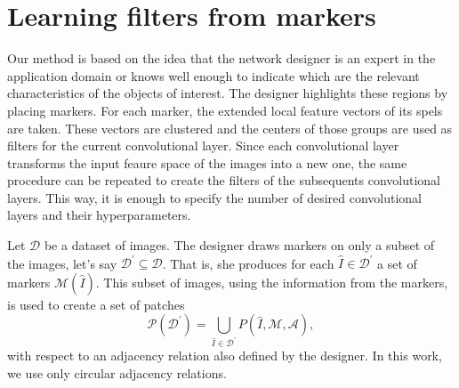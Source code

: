 \documentclass[a4paper,conference]{IEEEtran}
\newcommand{\R}{\mathbb{R}}
\newcommand{\A}{\mathcal{A}}
\newcommand{\D}{\mathcal{D}}
\newcommand{\I}{\hat{I}}
\newcommand{\m}[1]{{\mathrm{\bf #1}}}
\newcommand{\E}{\tilde{\m{I}}}
\newcommand{\lI}{\m{I}}
\newcommand{\gN}{\m{N}}
\newcommand{\W}{\m{W}}
\newcommand{\M}{\mathcal{M}}
\newcommand{\Pa}{\mathcal{P}}
\newcommand{\pDD}{\D^\prime}
\begin{document}

\section{Learning filters from markers}
Our method is based on the idea that the network designer is an expert in the application domain or knows well enough to indicate which are the relevant characteristics of the objects of interest. The designer highlights these regions by placing markers. For each marker, the extended local feature vectors of its spels are taken. These vectors are clustered and the centers of those groups are used as filters for the current convolutional layer. Since each convolutional layer transforms the input feaure space of the images into a new one, the same procedure can be repeated to create the filters of the subsequents convolutional layers. This way, it is enough to specify the number of desired convolutional layers and their hyperparameters. 

Let $\D$ be a dataset of images. The designer draws markers on only a subset of the images, let's say $\pDD \subseteq \D$. That is, she produces for each $\I \in \pDD$ a set of markers $\M(\I)$.  This subset of images, using the information from the markers, is used to create a set of patches \[\Pa(\pDD) = \bigcup_{\I \in \pDD}{P(\I, \M, \A)},\] with respect to an adjacency relation also defined by the designer. In this work, we use only circular adjacency relations.
\end{document}
